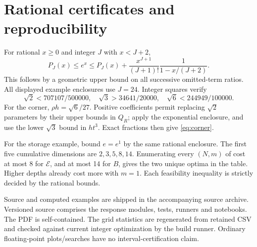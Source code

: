 \documentclass[11pt,a4paper]{article}
\newcommand{\E}{\mathcal E}
\begin{document}
\section{Rational certificates and reproducibility}\label{app:cert}
For rational \(x\ge0\) and integer \(J\) with \(x<J+2\),
\[
 P_J(x)\le e^x\le
 P_J(x)+\frac{x^{J+1}}{(J+1)!}\frac1{1-x/(J+2)}.
\]
This follows by a geometric upper bound on all successive omitted-term
ratios. All displayed example enclosures use \(J=24\).
Integer squares verify
\[
 \sqrt2<707107/500000,\quad
 \sqrt3>34641/20000,\quad \sqrt6<244949/100000.
\]
For the corner, \(\rho h=\sqrt6/27\).
Positive coefficients permit replacing \(\sqrt2\) parameters by their upper
bounds in \(Q_R\); apply the exponential enclosure, and use the lower
\(\sqrt3\) bound in \(ht^3\). Exact fractions then give \eqref{eq:corner}.

For the storage example, bound \(e=e^1\) by the same rational enclosure.
The first five cumulative dimensions are \(2,3,5,8,14\).
Enumerating every \((N,m)\) of cost at most 8 for \(\E\), and at most 14
for \(B\), gives the two unique optima in the table. Higher depths already
cost more with \(m=1\). Each feasibility inequality is strictly decided by
the rational bounds.

Source and computed examples are shipped in the accompanying source archive.
Versioned source comprises the response modules, tests, runners and notebooks.
The PDF is self-contained.
The grid statistics are regenerated from retained CSV and checked against
current integer optimization by the build runner.
Ordinary floating-point plots/searches have no interval-certification claim.
\end{document}
